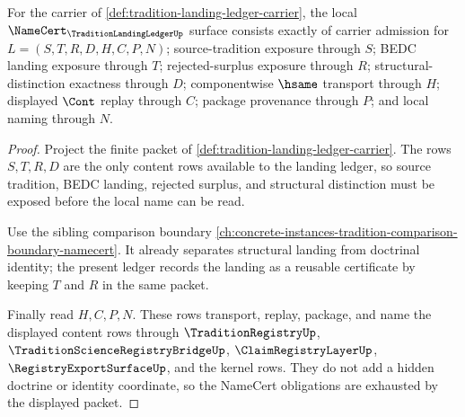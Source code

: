\begin{theorem}
\label{thm:tradition-landing-ledger-namecert-obligations}
For the carrier of \autoref{def:tradition-landing-ledger-carrier}, the local $\NameCert_{\TraditionLandingLedgerUp}$ surface consists exactly of carrier admission for $L=(S,T,R,D,H,C,P,N)$; source-tradition exposure through $S$; BEDC landing exposure through $T$; rejected-surplus exposure through $R$; structural-distinction exactness through $D$; componentwise $\hsame$ transport through $H$; displayed $\Cont$ replay through $C$; package provenance through $P$; and local naming through $N$.
\end{theorem}
\begin{proof}
Project the finite packet of \autoref{def:tradition-landing-ledger-carrier}. The rows $S,T,R,D$ are the only content rows available to the landing ledger, so source tradition, BEDC landing, rejected surplus, and structural distinction must be exposed before the local name can be read.

Use the sibling comparison boundary \autoref{ch:concrete-instances-tradition-comparison-boundary-namecert}. It already separates structural landing from doctrinal identity; the present ledger records the landing as a reusable certificate by keeping $T$ and $R$ in the same packet.

Finally read $H,C,P,N$. These rows transport, replay, package, and name the displayed content rows through $\TraditionRegistryUp$, $\TraditionScienceRegistryBridgeUp$, $\ClaimRegistryLayerUp$, $\RegistryExportSurfaceUp$, and the kernel rows. They do not add a hidden doctrine or identity coordinate, so the NameCert obligations are exhausted by the displayed packet.
\end{proof}

